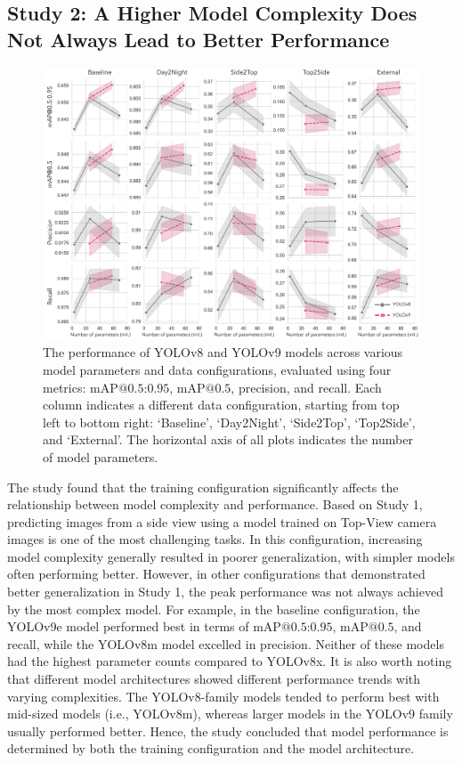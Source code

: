 \subsection*{Study 2: A Higher Model Complexity Does Not Always Lead to Better Performance}

\begin{figure}[h]
\centering
\includegraphics[width=1\textwidth]{figure_4.jpg}
\caption{The performance of YOLOv8 and YOLOv9 models across various model parameters and data configurations, evaluated using four metrics: $\text{mAP@{0.5:0.95}}$, $\text{mAP@{0.5}}$, precision, and recall. Each column indicates a different data configuration, starting from top left to bottom right: `Baseline', `Day2Night', `Side2Top', `Top2Side', and `External'. The horizontal axis of all plots indicates the number of model parameters.}
\label{fig:models}
\end{figure}

The study found that the training configuration significantly affects the relationship between model complexity and performance. Based on Study 1, predicting images from a side view using a model trained on Top-View camera images is one of the most challenging tasks. In this configuration, increasing model complexity generally resulted in poorer generalization, with simpler models often performing better. However, in other configurations that demonstrated better generalization in Study 1, the peak performance was not always achieved by the most complex model. For example, in the baseline configuration, the YOLOv9e model performed best in terms of $\text{mAP@{0.5:0.95}}$, $\text{mAP@{0.5}}$, and recall, while the YOLOv8m model excelled in precision. Neither of these models had the highest parameter counts compared to YOLOv8x. It is also worth noting that different model architectures showed different performance trends with varying complexities. The YOLOv8-family models tended to perform best with mid-sized models (i.e., YOLOv8m), whereas larger models in the YOLOv9 family usually performed better. Hence, the study concluded that model performance is determined by both the training configuration and the model architecture.

